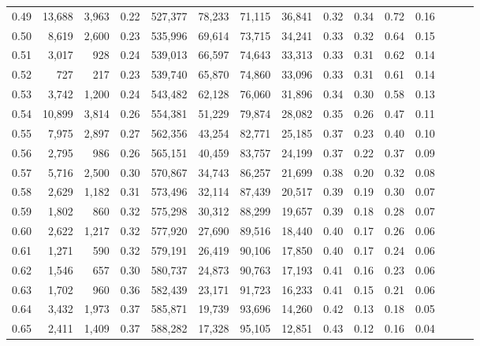 \begin{tabular}{rrrrrrrrrrrrrrr}
0.49 &  13,688 &  3,963 &  0.22 &  527,377 &   78,233 &   71,115 &   36,841 &  0.32 &  0.34 &  0.72 &      0.16 \\
0.50 &   8,619 &  2,600 &  0.23 &  535,996 &   69,614 &   73,715 &   34,241 &  0.33 &  0.32 &  0.64 &      0.15 \\
0.51 &   3,017 &    928 &  0.24 &  539,013 &   66,597 &   74,643 &   33,313 &  0.33 &  0.31 &  0.62 &      0.14 \\
0.52 &     727 &    217 &  0.23 &  539,740 &   65,870 &   74,860 &   33,096 &  0.33 &  0.31 &  0.61 &      0.14 \\
0.53 &   3,742 &  1,200 &  0.24 &  543,482 &   62,128 &   76,060 &   31,896 &  0.34 &  0.30 &  0.58 &      0.13 \\
0.54 &  10,899 &  3,814 &  0.26 &  554,381 &   51,229 &   79,874 &   28,082 &  0.35 &  0.26 &  0.47 &      0.11 \\
0.55 &   7,975 &  2,897 &  0.27 &  562,356 &   43,254 &   82,771 &   25,185 &  0.37 &  0.23 &  0.40 &      0.10 \\
0.56 &   2,795 &    986 &  0.26 &  565,151 &   40,459 &   83,757 &   24,199 &  0.37 &  0.22 &  0.37 &      0.09 \\
0.57 &   5,716 &  2,500 &  0.30 &  570,867 &   34,743 &   86,257 &   21,699 &  0.38 &  0.20 &  0.32 &      0.08 \\
0.58 &   2,629 &  1,182 &  0.31 &  573,496 &   32,114 &   87,439 &   20,517 &  0.39 &  0.19 &  0.30 &      0.07 \\
0.59 &   1,802 &    860 &  0.32 &  575,298 &   30,312 &   88,299 &   19,657 &  0.39 &  0.18 &  0.28 &      0.07 \\
0.60 &   2,622 &  1,217 &  0.32 &  577,920 &   27,690 &   89,516 &   18,440 &  0.40 &  0.17 &  0.26 &      0.06 \\
0.61 &   1,271 &    590 &  0.32 &  579,191 &   26,419 &   90,106 &   17,850 &  0.40 &  0.17 &  0.24 &      0.06 \\
0.62 &   1,546 &    657 &  0.30 &  580,737 &   24,873 &   90,763 &   17,193 &  0.41 &  0.16 &  0.23 &      0.06 \\
0.63 &   1,702 &    960 &  0.36 &  582,439 &   23,171 &   91,723 &   16,233 &  0.41 &  0.15 &  0.21 &      0.06 \\
0.64 &   3,432 &  1,973 &  0.37 &  585,871 &   19,739 &   93,696 &   14,260 &  0.42 &  0.13 &  0.18 &      0.05 \\
0.65 &   2,411 &  1,409 &  0.37 &  588,282 &   17,328 &   95,105 &   12,851 &  0.43 &  0.12 &  0.16 &      0.04 \\

\end{tabular}
